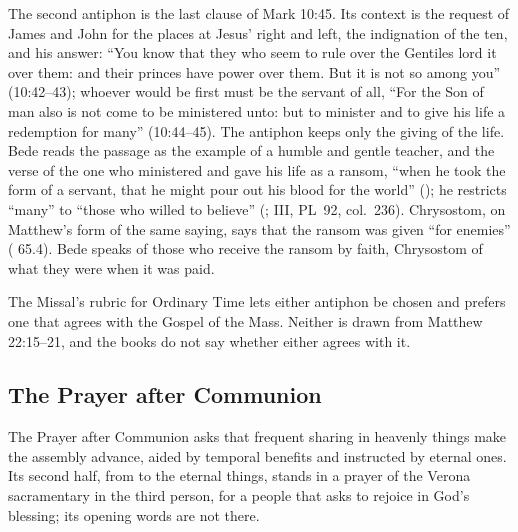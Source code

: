 The second antiphon is the last clause of Mark 10:45. Its context is the
request of James and John for the places at Jesus' right and left, the
indignation of the ten, and his answer: ``You know that they who seem to rule
over the Gentiles lord it over them: and their princes have power over them.
But it is not so among you'' (10:42--43); whoever would be first must be the
servant of all, ``For the Son of man also is not come to be ministered unto:
but to minister and to give his life a redemption for many'' (10:44--45). The
antiphon keeps only the giving of the life. Bede reads the passage as the
example of a humble and gentle teacher, and the verse of the one who ministered
and gave his life as a ransom, ``when he took the form of a servant, that he
might pour out his blood for the world'' (); he restricts ``many'' to ``those who
willed to believe'' (;  III, PL~92, col.~236). Chrysostom, on Matthew's form of
the same saying, says that the ransom was given ``for enemies''
( 65.4). Bede speaks of those who receive the ransom
by faith, Chrysostom of what they were when it was paid.

The Missal's rubric for Ordinary Time lets either antiphon be chosen and
prefers one that agrees with the Gospel of the Mass. Neither is drawn from
Matthew 22:15--21, and the books do not say whether either agrees with it.

\subsection{The Prayer after Communion}

The Prayer after Communion asks that frequent sharing in heavenly things make
the assembly advance, aided by temporal benefits and instructed by eternal
ones. Its second half, from  to the
eternal things, stands in a prayer of the Verona sacramentary in the third
person, for a people that asks to rejoice in God's blessing; its opening words
are not there.
